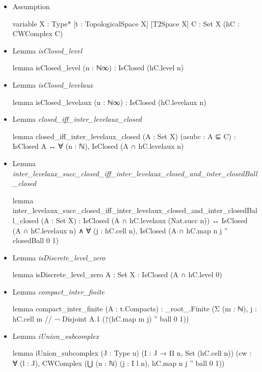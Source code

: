 \documentclass[colorinlistoftodos]{article}
\newcommand{\comment}[1]{\todo[color=lightgray, nolist]{#1}}
\begin{document}
\begin{itemize}
  \item Assumption
\begin{leancode}
variable {X : Type*} [t : TopologicalSpace X] [T2Space X] {C : Set X} (hC : CWComplex C)
\end{leancode}
  \item Lemma \emph{isClosed\_level}
\begin{leancode}
lemma isClosed_level (n : ℕ∞) : IsClosed (hC.level n)
\end{leancode}
  \item Lemma \emph{isClosed\_levelaux}
\begin{leancode}
lemma isClosed_levelaux (n : ℕ∞) : IsClosed (hC.levelaux n)
\end{leancode}
  \item Lemma \emph{closed\_iff\_inter\_levelaux\_closed}
\begin{leancode}
lemma closed_iff_inter_levelaux_closed (A : Set X) (asubc : A ⊆ C) : 
IsClosed A ↔ ∀ (n : ℕ), IsClosed (A ∩ hC.levelaux n)
\end{leancode}
  \item Lemma \emph{inter\_levelaux\_succ\_closed\_iff\_inter\_levelaux\_closed\_and\_inter\_closedBall\_closed}
\begin{leancode}
lemma inter_levelaux_succ_closed_iff_inter_levelaux_closed_and_inter_closedBall_closed 
(A : Set X) : IsClosed (A ∩ hC.levelaux (Nat.succ n)) ↔ 
IsClosed (A ∩ hC.levelaux n) ∧ ∀ (j : hC.cell n), IsClosed (A ∩ hC.map n j '' closedBall 0 1)
\end{leancode}
  \item Lemma \emph{isDiscrete\_level\_zero}
\begin{leancode}
lemma isDiscrete_level_zero {A : Set X} : IsClosed (A ∩ hC.level 0)
\end{leancode} 
  \item Lemma \emph{compact\_inter\_finite}
\begin{leancode}
lemma compact_inter_finite (A : t.Compacts) : 
  _root_.Finite (Σ (m : ℕ), {j : hC.cell m // ¬ Disjoint A.1 (↑(hC.map m j) '' ball 0 1)})
\end{leancode}
  \item Lemma \emph{iUnion\_subcomplex} \comment{Use CWComplex\_ subcomplex}
\begin{leancode}
lemma iUnion_subcomplex (J : Type u) (I : J → Π n, Set (hC.cell n))
(cw : ∀ (l : J), CWComplex (⋃ (n : ℕ) (j : I l n), hC.map n j '' ball 0 1)) 

\end{leancode}
\end{itemize}
\end{document}
